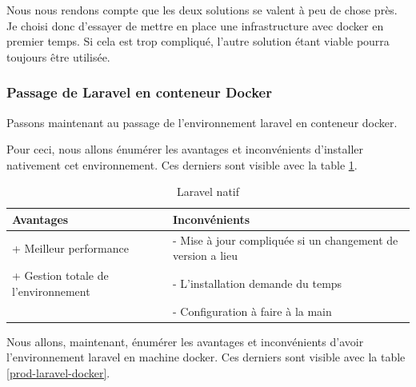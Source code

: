 \documentclass[
    iai, %
    il, %
]{heig-tb}
\begin{document}
Nous nous rendons compte que les deux solutions se valent à peu de chose près. Je choisi donc d'essayer de mettre en place une infrastructure avec \Gls{docker} en premier temps. Si cela est trop compliqué, l'autre solution étant viable pourra toujours être utilisée.

\subsubsection{Passage de Laravel en conteneur Docker}
Passons maintenant au passage de l'environnement \Gls{laravel} en \Gls{conteneur} \Gls{docker}.

Pour ceci, nous allons énumérer les avantages et inconvénients d'installer nativement cet
environnement. Ces derniers sont visible avec la table \ref{prod-laravel-native}.

\begin{table}[h]
    \begin{center}
        \caption{Laravel natif \label{prod-laravel-native}}
        \begin{tabularx}{1.0\textwidth} {X|X}
            Avantages                           & Inconvénients                                               \\ \hline
            + Meilleur performance              & - Mise à jour compliquée si un changement de version a lieu \\
            + Gestion totale de l'environnement & - L'installation demande du temps                           \\
                                                & - Configuration à faire à la main                           \\
        \end{tabularx}
    \end{center}
\end{table}

Nous allons, maintenant, énumérer les avantages et inconvénients d'avoir l'environnement \Gls{laravel}
en machine \Gls{docker}. Ces derniers sont visible avec la table \ref{prod-laravel-docker}.
\end{document}

